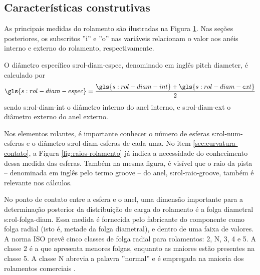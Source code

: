 \documentclass[12pt,oneside,english,brazil,lmodern,siglas,simbolos,cite=num]{ucsmonograph}
\begin{document}
	\subsection{Características construtivas}
	As principais medidas do rolamento são ilustradas na Figura \ref{fig:rolamento-medidas}.
	Nas seções posteriores, os subscritos ''i'' e ''o'' nas variáveis relacionam o valor aos anéis interno e externo do rolamento, respectivamente.
	
	O diâmetro específico \gls{s:rol-diam-espec}, denominado em inglês \foreignlanguage{english}{pitch diameter}, é calculado por
	\begin{equation} \label{eqn:rol:diam-espec}
		\gls{s:rol-diam-espec} = \frac{\gls{s:rol-diam-int} + 
		\gls{s:rol-diam-ext}}{2}
	\end{equation}
	sendo \gls{s:rol-diam-int} o diâmetro interno do anel interno, e \gls{s:rol-diam-ext} o diâmetro externo do anel externo.
	
	Nos elementos rolantes, é importante conhecer o número de esferas \gls{s:rol-num-esferas} e o diâmetro \gls{s:rol-diam-esferas} de cada uma.
	No item \ref{sec:curvatura-contato}, a Figura \ref{fig:raios-rolamento} já indica a necessidade do conhecimento dessa medida das esferas.	
	Também na mesma figura, é visível que o raio da pista -- denominada em inglês pelo termo \foreignlanguage{english}{groove} -- do anel, \gls{s:rol-raio-groove}, também é relevante nos cálculos.
	
	No ponto de contato entre a esfera e o anel, uma dimensão importante para a determinação posterior da distribuição de carga do rolamento é a folga diametral \gls{s:rol-folga-diam}.
	Essa medida é fornecida pelo fabricante do componente como folga radial (isto é, metade da folga diametral), e dentro de uma faixa de valores.
	A norma ISO prevê cinco classes de folga radial para rolamentos: 2, N, 3, 4 e 5. A classe 2 é a que apresenta menores folgas, enquanto as maiores estão presentes na classe 5.
	A classe N abrevia a palavra ''normal'' e é empregada na maioria dos rolamentos comerciais \cite{skfClearance}.
		
	\begin{figure}[ht]
		\label{fig:rolamento-medidas}
	\end{figure}
\end{document}
